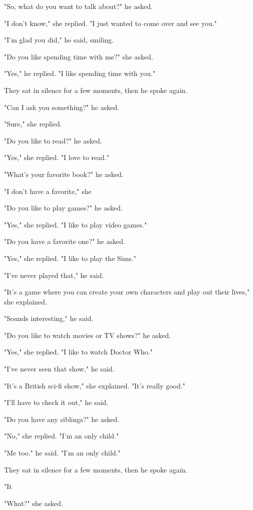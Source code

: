 \documentclass[smalldemyvopaper,11pt,twoside,onecolumn,openright,extrafontsizes]{memoir}
\begin{document}
"So, what do you want to talk about?" he asked.\par
"I don't know," she replied. "I just wanted to come over and see you."\par
"I'm glad you did," he said, smiling.\par
"Do you like spending time with me?" she asked.\par
"Yes," he replied. "I like spending time with you."\par
They sat in silence for a few moments, then he spoke again.\par
"Can I ask you something?" he asked.\par
"Sure," she replied.\par
"Do you like to read?" he asked.\par
"Yes," she replied. "I love to read."\par
"What's your favorite book?" he asked.\par
"I don't have a favorite," she\par
"Do you like to play games?" he asked.\par
"Yes," she replied. "I like to play video games."\par
"Do you have a favorite one?" he asked.\par
"Yes," she replied. "I like to play the Sims."\par
"I've never played that," he said.\par
"It's a game where you can create your own characters and play out their lives," she explained.\par
"Sounds interesting," he said.\par
"Do you like to watch movies or TV shows?" he asked.\par
"Yes," she replied. "I like to watch Doctor Who."\par
"I've never seen that show," he said.\par
"It's a British sci-fi show," she explained. "It's really good."\par
"I'll have to check it out," he said.\par
"Do you have any siblings?" he asked.\par
"No," she replied. "I'm an only child."\par
"Me too," he said. "I'm an only child."\par
They sat in silence for a few moments, then he spoke again.\par
"It\par
"What?" she asked.\par
\end{document}

